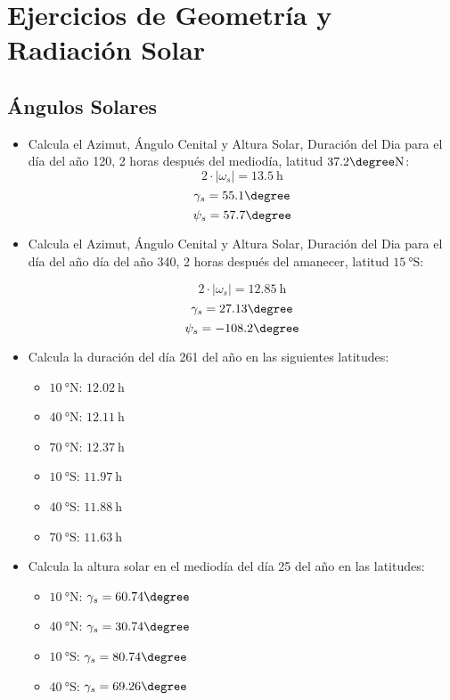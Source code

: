 \chapter{Ejercicios de Geometría y Radiación Solar}


\section{Ángulos Solares}

\begin{itemize}
\item Calcula el Azimut, Ángulo Cenital y Altura Solar, Duración del
  Dia para el día del año 120, 2 horas después del mediodía, latitud
  $37.2\degree\mathrm{N}$:
  \[
    2\cdot\left|\omega_{s}\right|=\SI{13.5}{\hour}\]
  \[
    \gamma_{s}=55.1\degree\]
  \[
    \psi_{s}=57.7\degree\]

\item Calcula el Azimut, Ángulo Cenital y Altura Solar, Duración del
  Dia para el día del año día del año 340, 2 horas después del
  amanecer, latitud $\SI{15}{\degree}\mathrm{S}$:

\[
  2\cdot\left|\omega_{s}\right|=\SI{12.85}{\hour}\]
\[
  \gamma_{s}=27.13\degree\]
\[
  \psi_{s}=-108.2\degree\]

\item Calcula la duración del día 261 del año en las siguientes
  latitudes:

  \begin{itemize}
  \item $\SI{10}{\degree}\mathrm{N}$: $\SI{12.02}{\hour}$
  \item $\SI{40}{\degree}\mathrm{N}$: $\SI{12.11}{\hour}$
  \item $\SI{70}{\degree}\mathrm{N}$: $\SI{12.37}{\hour}$
  \item $\SI{10}{\degree}\mathrm{S}$: $\SI{11.97}{\hour}$
  \item $\SI{40}{\degree}\mathrm{S}$: $\SI{11.88}{\hour}$
  \item $\SI{70}{\degree}\mathrm{S}$: $\SI{11.63}{\hour}$
  \end{itemize}

\item Calcula la altura solar en el mediodía del día 25 del año en las
  latitudes:

  \begin{itemize}
  \item $\SI{10}{\degree}\mathrm{N}$: $\gamma_{s}=60.74\degree$
  \item $\SI{40}{\degree}\mathrm{N}$: $\gamma_{s}=30.74\degree$
  \item $\SI{10}{\degree}\mathrm{S}$: $\gamma_{s}=80.74\degree$
  \item $\SI{40}{\degree}\mathrm{S}$: $\gamma_{s}=69.26\degree$
  \end{itemize}


\end{itemize}
